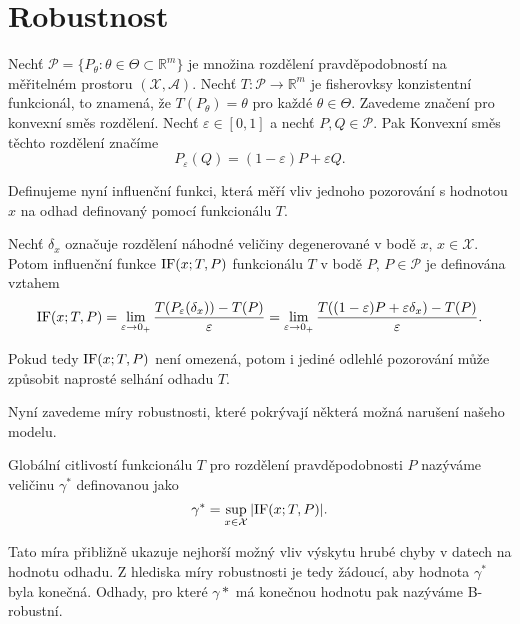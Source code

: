 \chapter{Robustnost}

Nech\v{t} $\mathcal{P} = \lbrace P_\theta : \theta \in \Theta \subset \mathbb{R}^m \rbrace$ je množina rozdělení pravděpodobností na měřitelném prostoru $\left(\mathcal{X},\mathcal{A}\right)$. Nech\v{t} $T: \mathcal{P} \rightarrow \mathbb{R}^m$ je fisherovksy konzistentní funkcionál, to znamená, že $T(P_\theta) = \theta$ pro každé $\theta \in \Theta$. Zavedeme značení pro konvexní směs rozdělení. Nech\v{t} $\varepsilon \in [0,1]$ a nech\v{t} $P, Q \in \mathcal{P}$. Pak Konvexní směs těchto rozdělení značíme 
\begin{equation}
	P_\varepsilon(Q) = (1-\varepsilon)P + \varepsilon Q.
\end{equation}

\noindent
Definujeme nyní influenční funkci, která měří vliv jednoho pozorování s hodnotou $x$ na odhad definovaný pomocí funkcionálu $T$. 

\begin{definition}
	Nech\v{t} $\delta_x$ označuje rozdělení náhodné veličiny degenerované v bodě $x,\, x \in \mathcal{X}$. Potom influenční funkce $\mathrm{IF}({x};T,P)$ funkcionálu $T$ v bodě $P,\, P \in \mathcal{P}$ je definována vztahem
	\begin{equation}
		\mathrm{IF}({x};T,P) = \lim_{\varepsilon \rightarrow 0_+} \frac{T(P_\varepsilon(\delta_x)) - T(P)}{\varepsilon} = \lim_{\varepsilon \rightarrow 0_+} \frac{T((1-\varepsilon)P + \varepsilon\delta_x) - T(P)}{\varepsilon}.
	\end{equation} 
\end{definition}

\noindent
Pokud tedy $\mathrm{IF}({x};T,P)$ není omezená, potom i jediné odlehlé pozorování může způsobit naprosté selhání odhadu $T$. 

Nyní zavedeme míry robustnosti, které pokrývají některá možná narušení našeho modelu. 

\begin{definition}
	Globální citlivostí funkcionálu $T$ pro rozdělení pravděpodobnosti $P$ nazýváme veličinu $\gamma^*$ definovanou jako
	\begin{equation}
		\gamma^* = \sup_{x \in \mathcal{X}} |\mathrm{IF}({x};T,P)|.
	\end{equation}
\end{definition}
Tato míra přibližně ukazuje nejhorší možný vliv výskytu hrubé chyby v datech na hodnotu odhadu. Z hlediska míry robustnosti je tedy žádoucí, aby hodnota $\gamma^*$ byla konečná. Odhady, pro které $\gamma*$ má konečnou hodnotu pak nazýváme B-robustní.

